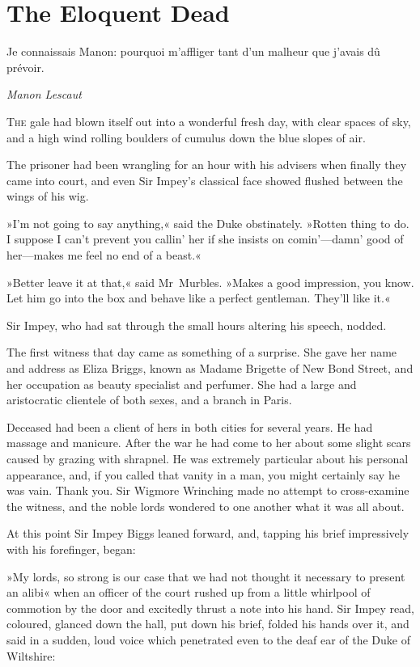 

\chapter{The Eloquent Dead}

\epigraph{\begin{french}Je connaissais Manon: pourquoi m'affliger tant d'un malheur que j'avais dû prévoir.\end{french}}{\textit{Manon Lescaut}}



\lettrine[lines=4]{T}{he} gale had blown itself out into a wonderful fresh day, with clear
spaces of sky, and a high wind rolling boulders of cumulus down the
blue slopes of air.

\zz
The prisoner had been wrangling for an hour with his advisers when
finally they came into court, and even Sir Impey's classical face
showed flushed between the wings of his wig.

»I'm not going to say anything,« said the Duke obstinately. »Rotten
thing to do. I suppose I can't prevent you callin' her if she insists
on comin'—damn' good of her—makes me feel no end of a beast.«

»Better leave it at that,« said Mr~Murbles. »Makes a good impression,
you know. Let him go into the box and behave like a perfect gentleman.
They'll like it.«

Sir Impey, who had sat through the small hours altering his speech,
nodded.

The first witness that day came as something of a surprise. She gave
her name and address as Eliza Briggs, known as Madame Brigette of New
Bond Street, and her occupation as beauty specialist and perfumer. She
had a large and aristocratic clientele of both sexes, and a branch in
Paris.

Deceased had been a client of hers in both cities for several years.
He had massage and manicure. After the war he had come to her about
some slight scars caused by grazing with shrapnel. He was extremely
particular about his personal appearance, and, if you called that
vanity in a man, you might certainly say he was vain. Thank you. Sir
Wigmore Wrinching made no attempt to cross-examine the witness, and the
noble lords wondered to one another what it was all about.

At this point Sir Impey Biggs leaned forward, and, tapping his brief
impressively with his forefinger, began:

»My lords, so strong is our case that we had not thought it necessary
to present an alibi\longdash« when an officer of the court rushed up from a
little whirlpool of commotion by the door and excitedly thrust a note
into his hand. Sir Impey read, coloured, glanced down the hall, put down
his brief, folded his hands over it, and said in a sudden, loud voice
which penetrated even to the deaf ear of the Duke of Wiltshire:

